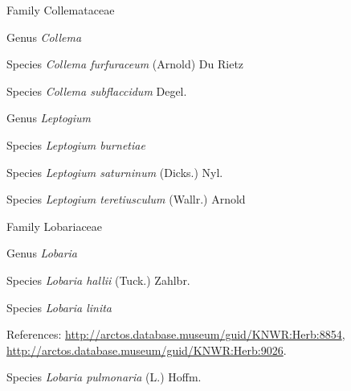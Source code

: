 \documentclass[9pt, article]{memoir}
\begin{document}
\begin{multicols}{2}
\vspace{6pt}\noindent\hspace{24pt}Family Collemataceae


\vspace{6pt}\noindent\hspace{30pt}Genus \textit{Collema}


\vspace{6pt}\noindent\hspace{36pt}Species \textit{Collema furfuraceum} (Arnold) Du Rietz


\vspace{6pt}\noindent\hspace{36pt}Species \textit{Collema subflaccidum} Degel.


\vspace{6pt}\noindent\hspace{30pt}Genus \textit{Leptogium}


\vspace{6pt}\noindent\hspace{36pt}Species \textit{Leptogium burnetiae}


\vspace{6pt}\noindent\hspace{36pt}Species \textit{Leptogium saturninum} (Dicks.) Nyl.


\vspace{6pt}\noindent\hspace{36pt}Species \textit{Leptogium teretiusculum} (Wallr.) Arnold


\vspace{6pt}\noindent\hspace{24pt}Family Lobariaceae


\vspace{6pt}\noindent\hspace{30pt}Genus \textit{Lobaria}


\vspace{6pt}\noindent\hspace{36pt}Species \textit{Lobaria hallii} (Tuck.) Zahlbr.


\vspace{6pt}\noindent\hspace{36pt}Species \textit{Lobaria linita}


\vspace{6pt}References: 
\url{http://arctos.database.museum/guid/KNWR:Herb:8854}, 
\url{http://arctos.database.museum/guid/KNWR:Herb:9026}.

\vspace{6pt}\noindent\hspace{36pt}Species \textit{Lobaria pulmonaria} (L.) Hoffm.



\end{multicols}
\end{document}
